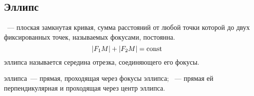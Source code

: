 \subsection{Эллипс}
\label{sec:ellips}

{\bfseries {}}~--- плоская замкнутая кривая, сумма расстояний от любой точки которой до двух фиксированных точек, называемых фокусами, постоянна.
\begin{equation}
    |F_1 M| + |F_2 M|=\operatorname{const} \label{eq:ell-def}
\end{equation}
 эллипса называется середина отрезка, соединяющего его фокусы.

 эллипса~--- прямая, проходящая через фокусы эллипса; ~--- прямая ей перпендикулярная и проходящая через центр эллипса.

